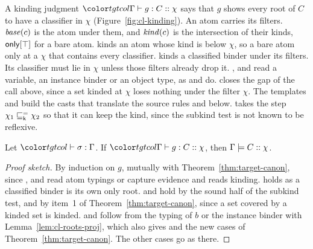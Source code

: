 A kinding judgment $\kindj{\Gamma}{g}{C}{\chi}$ says that $g$ shows every root of $C$ to have a classifier in $\chi$ (Figure~\ref{fig:cl-kinding}). An atom carries its filters. $\mathit{base}(c)$ is the atom under them, and $\mathit{kind}(c)$ is the intersection of their kinds, $\mathsf{only}[\top]$ for a bare atom.  kinds an atom whose kind is below $\chi$, so a bare atom only at a $\chi$ that contains every classifier.  kinds a classified binder under its filters. Its classifier must lie in $\chi$ unless those filters already drop it. ,  and  read a variable, an instance binder or an object type, as  and  do.  closes the gap of the call above, since a set kinded at $\chi$ loses nothing under the filter $\chi$. The templates  and  build the casts that translate the source rules  and  below.  takes the step $\chi_1 \sqsubseteq^{=}_{\mathsf{k}} \chi_2$ so that it can keep the kind, since the subkind test is not known to be reflexive.

\begin{theorem}\label{thm:cl-kind}
Let $\storej{\sigma}{\Gamma}$. If $\kindj{\Gamma}{g}{C}{\chi}$, then $\Gamma \models C :: \chi$.
\end{theorem}

\begin{proof}[Proof sketch]
By induction on $g$, mutually with Theorem~\ref{thm:target-canon}, since ,  and  read atom typings or capture evidence and  reads kinding.  holds as a classified binder is its own only root.  and  hold by the sound half of the subkind test, and  by item~1 of Theorem~\ref{thm:target-canon}, since a set covered by a kinded set is kinded.  and  follow from the typing of $b$ or the instance binder with Lemma~\ref{lem:cl-roots-proj}, which also gives  and the new cases of Theorem~\ref{thm:target-canon}. The other cases go as there.
\end{proof}


